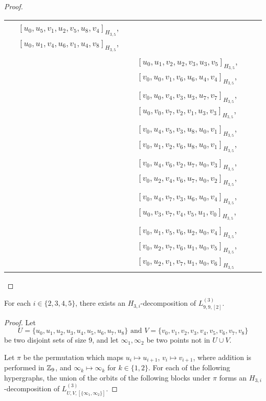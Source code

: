 \begin{subappendices}
\begin{proof}
{\begin{longtable}{|c|l|}
  $[u_0, u_5, v_1, u_2, v_5, u_8, v_4]_{H_{3,5}}$,
  $[u_0, u_1, v_4, u_6, v_1, u_4, v_8]_{H_{3,5}}$, \\* &
  $[u_0, u_1, v_2, u_2, v_3, u_3, v_5]_{H_{3,5}}$,
  $[v_0, u_0, v_1, v_6, u_6, u_4, v_4]_{H_{3,5}}$, \\* &
  $[v_0, u_0, v_4, v_3, u_3, u_7, v_7]_{H_{3,5}}$,
  $[u_0, v_0, v_7, v_2, v_1, u_3, v_3]_{H_{3,5}}$, \\* &
  $[v_0, u_4, v_5, v_3, u_8, u_0, v_1]_{H_{3,5}}$,
  $[v_0, u_1, v_2, v_6, u_8, u_0, v_1]_{H_{3,5}}$, \\* &
  $[v_0, u_4, v_6, v_2, u_7, u_0, v_3]_{H_{3,5}}$,
  $[v_0, u_2, v_4, v_6, u_7, u_0, v_2]_{H_{3,5}}$, \\* &
  $[v_0, u_4, v_7, v_3, u_6, u_0, v_4]_{H_{3,5}}$,
  $[u_0, v_3, v_7, v_4, v_5, u_1, v_0]_{H_{3,5}}$, \\* &
  $[v_0, u_1, v_5, v_6, u_2, u_0, v_4]_{H_{3,5}}$,
  $[v_0, u_2, v_7, v_6, u_1, u_0, v_5]_{H_{3,5}}$, \\* &
  $[v_0, u_2, v_1, v_7, u_1, u_0, v_6]_{H_{3,5}}$
\\ \hline
\end{longtable}
}
\end{proof}


\begin{example} \label{eg:H_3i-l99-k992}
For each $i \in \{2,3,4,5\}$, there exists an $H_{3,i}$-decomposition of $L_{9,9,[2]}^{(3)}$.
\end{example}

\begin{proof}
Let
\[
    U = \{u_0, u_1, u_2, u_3, u_4, u_5, u_6, u_7, u_8\} \text{ and }
    V = \{v_0, v_1, v_2, v_3, v_4, v_5, v_6, v_7, v_8\}
\]
be two disjoint sets of size 9, and let $\infty_1, \infty_2$ be two points not in $U \cup V$.

Let $\pi$ be the permutation which maps $u_i \mapsto u_{i+1}$, $v_i \mapsto v_{i+1}$, where addition is performed in $\mathbb{Z}_9$, and $\infty_k \mapsto \infty_k$ for $k \in \{1,2\}$.
For each of the following hypergraphs, the union of the orbits of the following blocks under $\pi$ forms an $H_{3,i}$-decomposition of $L_{U,V,[\{\infty_1, \infty_2\}]}^{(3)}$.


\end{proof}
\end{subappendices}
